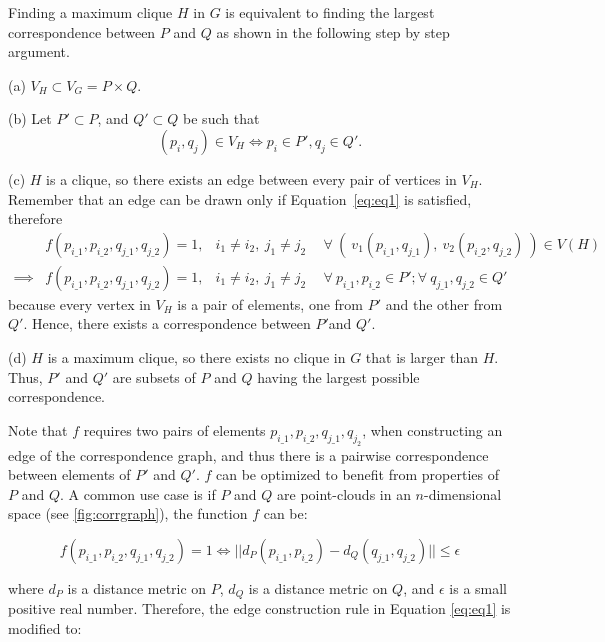\documentclass[12pt]{article}
\begin{document}
Finding a maximum clique $H$ in $G$ is equivalent
to finding the largest correspondence between $P$ and
$Q$ as shown in the following step by step argument.
\begin{description}
	\item (a) $V_H \subset V_G = P \times Q$.
	\item (b) Let $P' \subset P$, and $Q' \subset Q$ be such that
	      $$
		      (p_i,q_j) \in V_H \iff p_i \in P', q_j \in Q'.
	      $$
	\item (c) $H$ is a clique, so there exists an edge between every pair of
	      vertices in $V_H$. Remember that an edge can be drawn only if
	      Equation~\ref{eq:eq1} is satisfied, therefore
	      \begin{align*}
		                                 & f(p_{i\_1}, p_{i\_2}, q_{j\_1}, q_{j\_2}) = 1, &
		      i_1 \ne i_2,\  j_1 \ne j_2 & ~~
		      \forall\  (~v_1(p_{i\_1}, q_{j\_1}),~v_2(p_{i\_2}, q_{j\_2})~) \in V(H)       \\
		      \implies                   & f(p_{i\_1}, p_{i\_2}, q_{j\_1}, q_{j\_2}) = 1, &
		      i_1 \ne i_2,\  j_1 \ne j_2 & ~~
		      \forall\  p_{i\_1}, p_{i\_2} \in P';
		      \forall\  q_{j\_1}, q_{j\_2} \in Q'
	      \end{align*}
	      because every vertex in $V_H$ is a pair of elements, one from
	      $P'$ and the other from $Q'$. Hence, there exists a
	      correspondence between $P'$and $Q'$.
	\item (d) $H$ is a maximum clique, so there exists no clique in
	      $G$ that is larger than $H$. Thus,
	      $P'$ and $Q'$ are subsets of $P$
	      and $Q$ having the largest possible correspondence.
\end{description}

Note that $f$ requires two pairs of elements $p_{i\_1}, p_{i\_2},
	q_{j\_1}, q_{j_2}$,
when constructing an edge of the correspondence graph, and thus there is a pairwise
correspondence between elements of $P'$ and $Q'$.
$f$ can be optimized to benefit from properties of
$P$ and $Q$. A common use case is if
$P$ and $Q$ are point-clouds in an
$n$-dimensional space (see \autoref{fig:corrgraph}), the function
$f$ can be:

$$
	f(p_{i\_1}, p_{i\_2},
	q_{j\_1}, q_{j\_2}) = 1 \iff ||
	d_P(p_{i\_1}, p_{i\_2}) -
	d_Q(q_{j\_1}, q_{j\_2}) || \leq \epsilon
$$

where $d_P$ is a distance metric on $P$,
$d_Q$ is a distance metric on $Q$, and
$\epsilon$ is a small positive real number. Therefore, the edge construction
rule in Equation \ref{eq:eq1} is modified to:
\end{document}
